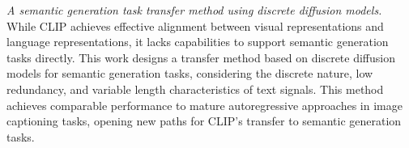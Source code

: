\begin{abstract*}
\textit{A semantic generation task transfer method using discrete diffusion models.} While CLIP achieves effective alignment between visual representations and language representations, it lacks capabilities to support semantic generation tasks directly. This work designs a transfer method based on discrete diffusion models for semantic generation tasks, considering the discrete nature, low redundancy, and variable length characteristics of text signals. This method achieves comparable performance to mature autoregressive approaches in image captioning tasks, opening new paths for CLIP's transfer to semantic generation tasks.
\end{abstract*}

